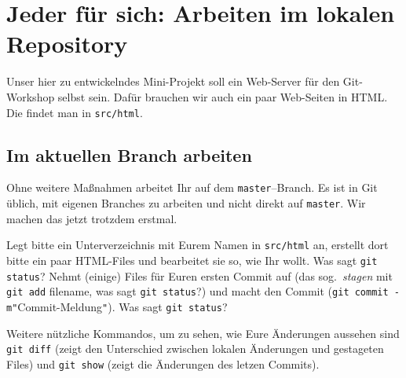 \documentclass[a4paper, 12pt]{article}
\newcounter{enumisave}
\newenvironment{enumerate*}%
{\begin{enumerate}\setcounter{enumi}{\theenumisave}}%
{\setcounter{enumisave}{\theenumi}\end{enumerate}}
\begin{document}
\section{Jeder für sich: Arbeiten im lokalen Repository}

Unser hier zu entwickelndes Mini-Projekt soll ein Web-Server für 
den Git-Workshop selbst sein. Dafür brauchen wir auch ein paar Web-Seiten in
HTML. Die findet man in \texttt{src/html}.

\subsection*{Im aktuellen Branch arbeiten}\vspace{-1.5ex}
Ohne weitere Maßnahmen arbeitet Ihr auf dem \texttt{master}--Branch.
Es ist in Git üblich, mit eigenen Branches zu arbeiten und nicht direkt auf
\texttt{master}. Wir machen das jetzt trotzdem erstmal.

\begin{enumerate*}

\item Legt bitte ein Unterverzeichnis mit Eurem Namen in \texttt{src/html} an, erstellt dort bitte ein paar HTML-Files und bearbeitet sie so, wie Ihr wollt. Was sagt \texttt{git status}? Nehmt (einige) Files für Euren ersten Commit auf (das sog.\ \emph{stagen} mit \texttt{git add} \textsf{filename}, was sagt \texttt{git status}?) und macht den Commit (\texttt{git commit -m}\verb|"|\textsf{Commit-Meldung}\verb|"|).  Was sagt \texttt{git status}? 
\end{enumerate*}
Weitere nützliche Kommandos, um zu sehen, wie Eure Änderungen aussehen sind \texttt{git diff} (zeigt den Unterschied zwischen lokalen Änderungen und gestageten Files)
und \texttt{git show} (zeigt die Änderungen des letzen Commits).
\end{document}

